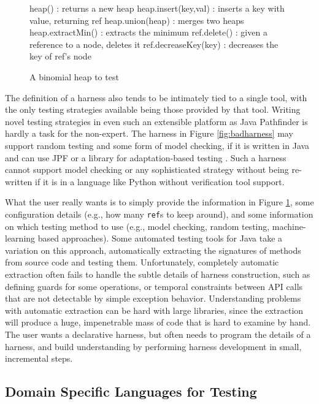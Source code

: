 \begin{figure}[t]
{\scriptsize
\begin{code}
heap()                : returns a new heap
heap.insert(key,val)  : inserts a key with value, returning ref
heap.union(heap)      : merges two heaps
heap.extractMin()     : extracts the minimum
ref.delete()          : given a reference to a node, deletes it
ref.decreaseKey(key)  : decreases the key of ref's node
\end{code}
}
\vspace{-0.1in}
\caption{A binomial heap to test}
\label{fig:binheap}
\vspace{-0.20in}
\end{figure}

The definition of a harness also tends to be intimately tied to a
single tool, with the only testing strategies available being those
provided by that tool.  Writing novel testing strategies in even such
an extensible platform as Java Pathfinder is hardly a task for the
non-expert.
The harness in Figure \ref{fig:badharness} may support random testing and
some form of model checking, if it is written in Java and can use JPF
or a library for adaptation-based testing \cite{ISSRE12}. Such a
harness cannot support model checking or any sophisticated strategy
without being re-written if it is in a language like Python without
verification tool support.

What the user really wants is to simply provide the information in
Figure \ref{fig:binheap}, some configuration details (e.g., how many
{\tt ref}s to keep around), and some information on which testing
method to use (e.g., model checking, random testing, machine-learning
based approaches).  Some automated testing tools for Java \cite{FA11,Pacheco}
take a variation on this approach, automatically extracting the
signatures of methods from source code and testing them.
Unfortunately, completely automatic extraction often fails to handle
the subtle details of harness construction, such as defining guards
for some operations, or temporal constraints between API calls that
are not detectable by simple exception behavior.  Understanding
problems with automatic extraction can be hard with large libraries,
since the extraction will produce a huge, impenetrable mass of code
that is hard to examine by hand.  The user wants a
declarative harness, but often needs to program the details of a
harness, and build understanding by performing harness development in
small, incremental steps.

\subsection{Domain Specific Languages for Testing}

